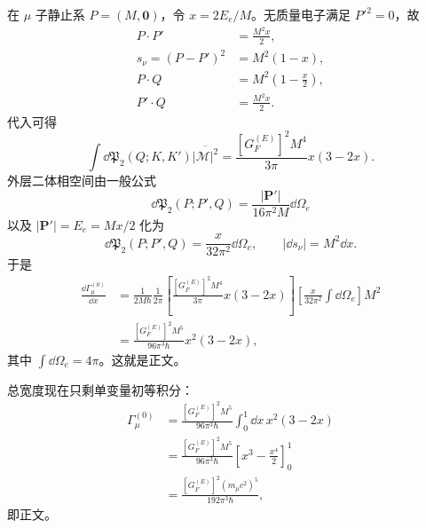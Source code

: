 \begin{derivation}[缪子衰变的自旋求和与三体相空间]
在 $\mu$ 子静止系 $P=(M,\mathbf0)$，令
$x=2E_e/M$。无质量电子满足 $P'^2=0$，故
\begin{align*}
P\!\cdot P'&=\frac{M^2x}{2},\\
s_\nu=(P-P')^2&=M^2(1-x),\\
P\!\cdot Q&=M^2\left(1-\frac{x}{2}\right),\\
P'\!\cdot Q&=\frac{M^2x}{2}.
\end{align*}
代入可得
\begin{equation*}
\int\dd\mathfrak P_2(Q;K,K')\overline{|\mathcal M|^2}
=\frac{[G_F^{(E)}]^2M^4}{3\pi}x(3-2x).
\end{equation*}
外层二体相空间由一般公式
\begin{equation*}
\dd\mathfrak P_2(P;P',Q)
=\frac{|\mathbf P'|}{16\pi^2M}\dd\Omega_e
\end{equation*}
以及 $|\mathbf P'|=E_e=Mx/2$ 化为
\begin{equation*}
\dd\mathfrak P_2(P;P',Q)
=\frac{x}{32\pi^2}\dd\Omega_e,
\qquad
|\dd s_\nu|=M^2\dd x.
\end{equation*}
于是
\begin{align*}
\frac{\dd\Gamma_\mu^{(0)}}{\dd x}
&=\frac{1}{2M\hbar}\frac1{2\pi}
\left[\frac{[G_F^{(E)}]^2M^4}{3\pi}x(3-2x)\right]
\left[\frac{x}{32\pi^2}\int\dd\Omega_e\right]M^2\\
&=\frac{[G_F^{(E)}]^2M^5}{96\pi^3\hbar}
 x^2(3-2x),
\end{align*}
其中 $\int\dd\Omega_e=4\pi$。这就是正文。

总宽度现在只剩单变量初等积分：
\begin{align*}
\Gamma_\mu^{(0)}
&=\frac{[G_F^{(E)}]^2M^5}{96\pi^3\hbar}
\int_0^1\dd x\,x^2(3-2x)\\
&=\frac{[G_F^{(E)}]^2M^5}{96\pi^3\hbar}
\left[x^3-\frac{x^4}{2}\right]_0^1\\
&=\frac{[G_F^{(E)}]^2(m_\mu c^2)^5}{192\pi^3\hbar},
\end{align*}
即正文。
\end{derivation}


